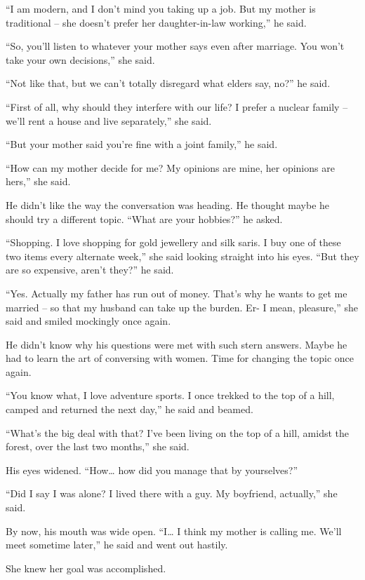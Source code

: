 “I am modern, and I don't mind you taking up a job. But my mother is traditional
– she doesn't prefer her daughter-in-law working,” he said.

“So, you'll listen to whatever your mother says even after marriage. You won't
take your own decisions,” she said.

“Not like that, but we can't totally disregard what elders say, no?” he said.

“First of all, why should they interfere with our life? I prefer a nuclear
family – we'll rent a house and live separately,” she said.

“But your mother said you're fine with a joint family,” he said.

“How can my mother decide for me? My opinions are mine, her opinions are hers,”
she said.

He didn't like the way the conversation was heading. He thought maybe he should
try a different topic. “What are your hobbies?” he asked.

“Shopping. I love shopping for gold jewellery and silk saris. I buy one of these
two items every alternate week,” she said looking straight into his eyes.
“But they are so expensive, aren't they?” he said.

“Yes. Actually my father has run out of money. That's why he wants to get me
married – so that my husband can take up the burden. Er- I mean, pleasure,” she
said and smiled mockingly once again.

He didn't know why his questions were met with such stern answers. Maybe he had
to learn the art of conversing with women. Time for changing the topic once
again.

“You know what, I love adventure sports. I once trekked to the top of a hill,
camped and returned the next day,” he said and beamed.

“What's the big deal with that? I've been living on the top of a hill, amidst
the forest, over the last two months,” she said.

His eyes widened. “How… how did you manage that by yourselves?”

“Did I say I was alone? I lived there with a guy. My boyfriend, actually,” she
said.

By now, his mouth was wide open. “I… I think my mother is calling me. We'll
meet sometime later,” he said and went out hastily.

She knew her goal was accomplished.


